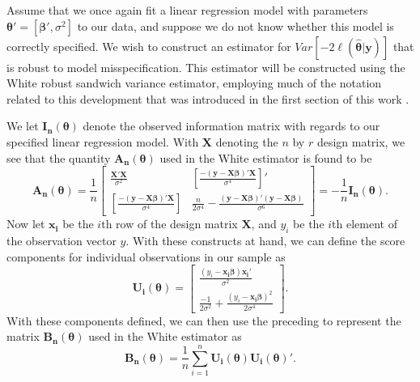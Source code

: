 \documentclass[sn-mathphys-ay]{sn-jnl}
\begin{document}
		Assume that we once again fit a linear regression model with parameters $\bm{\theta}' = [\bm{\beta}', \sigma^2]$ to our data, and suppose we do not know whether this model is correctly specified.
		We wish to construct an estimator for $Var \left[ -2 \ell (\hat{\bm{\theta}} | \bm{y} ) \right]$ that is robust to model misspecification. This estimator will be constructed using the White robust
		sandwich variance estimator, employing much of the notation related to this development that was introduced in the first section of this work \citep{White1980}.

		We let $\bm{I_{n}} (\bm{\theta})$ denote the observed information matrix with regards to our specified linear regression model. With $\bm{X}$ denoting the $n$ by $r$ design matrix, we see that
		the quantity $\bm{A_n} (\bm{\theta})$ used in the White estimator is found to be 
		\begin{equation*}
			\bm{A_n}(\bm{\theta}) = \frac{1}{n}
			\begin{bmatrix}
				\frac{\bm{X}'\bm{X}}{\sigma^2} & \left[ \frac{-(\bm{y}-\bm{X}\bm{\beta})'\bm{X}}{\sigma^4} \right]' \\
				\left[ \frac{-(\bm{y}-\bm{X}\bm{\beta})'\bm{X}}{\sigma^4} \right] &  \frac{n}{2 \sigma^4} - \frac{(\bm{y}-\bm{X}\bm{\beta})'(\bm{y}-\bm{X}\bm{\beta})}{\sigma^6}
				\end{bmatrix}
				= -\frac{1}{n} \bm{I_n}(\bm{\theta}) .
		\end{equation*}
		Now let $\bm{x_i}$ be the $i$th row of the design matrix $\bm{X}$, and $y_i$ be the $i$th element of the observation vector $y$. With these constructs at hand, we can define the score components
		for individual observations in our sample as
		\begin{equation*}
			\bm{U_i}(\bm{\theta}) = 
			\begin{bmatrix}
				\frac{(y_i-\bm{x_i} \bm{\beta})\bm{x_i}'}{\sigma^2} \\
				\frac{-1}{2 \sigma^2} + \frac{(y_i - \bm{x_i} \bm{\beta})^2}{2 \sigma^4}
			\end{bmatrix}
			.
		\end{equation*}
		With these components defined, we can then use the preceding to represent the matrix $\bm{B_n} (\bm{\theta})$ used in the White estimator as
		\begin{equation*}
			\bm{B_n}(\bm{\theta}) = \frac{1}{n} \sum_{i=1}^{n} \bm{U_i}(\bm{\theta}) \bm{U_i}(\bm{\theta})' .
		\end{equation*}
\end{document}
